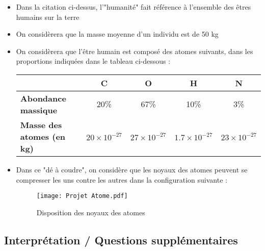 \documentclass[a4paper,12pt]{article}
\begin{document}
\begin{itemize}[noitemsep]
  \item Dans la citation ci-dessus, l'"humanité" fait référence à l'ensemble des êtres humains sur la terre
  \item On considèrera que la masse moyenne d'un individu est de 50 kg 
  \item On considèrera que l'être humain est composé des atomes suivants, dans les proportions indiquées dans le tableau ci-dessous : \par
  \vspace{1em}
  \begin{tabular}{lcccc}
    \toprule
    & \textbf{C} & \textbf{O} & \textbf{H} & \textbf{N} \\
    \midrule
    \textbf{Abondance massique} & 20\% & 67\% & 10\% & 3\% \\
    \textbf{Masse des atomes (en kg)} & \( 20 \times 10^{-27} \) & \( 27 \times 10^{-27} \) & \( 1.7 \times 10^{-27} \) & \( 23 \times 10^{-27} \) \\
    \bottomrule
\end{tabular}
\vspace{1em}

  \item Dans ce "dé à coudre", on considère que les noyaux des atomes peuvent se compresser les uns contre les autres dans la configuration suivante : 
  
  \begin{figure}[H]
    \centering
    \texttt{[image: Projet Atome.pdf]}
    \caption{\label{} Disposition des noyaux des atomes}
  \end{figure}

\end{itemize}

\subsection*{Interprétation / Questions supplémentaires}
\end{document}
